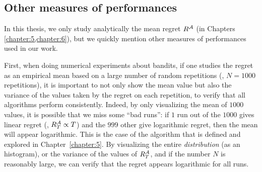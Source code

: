 \subsection{Other measures of performances}

In this thesis, we only study analytically the mean regret $R^{\mathcal{A}}$ (in Chapters \ref{chapter:5,chapter:6}), but we quickly mention other measures of performances used in our work.

First, when doing numerical experiments about bandits, if one studies the regret as an empirical mean based on a large number of random repetitions (\eg, $N=1000$ repetitions), it is important to not only show the mean value but also the variance of the values taken by the regret on each repetition, to verify that all algorithms perform consistently.
Indeed, by only visualizing the mean of $1000$ values, it is possible that we miss some ``bad runs'': if $1$ run out of the $1000$ gives linear regret (\ie, $R_T^{\mathcal{A}} \propto T$) and the $999$ other give logarithmic regret, then the mean will appear logarithmic.
This is the case of the \Selfish{} algorithm that is defined and explored in Chapter~\ref{chapter:5}.
By visualizing the entire \emph{distribution} (as an histogram), or the variance of the values of $R_T^{\mathcal{A}}$, and if the number $N$ is reasonably large, we can verify that the regret appears logarithmic for all runs.


